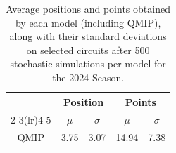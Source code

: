 \begin{table}[H]
\centering
\begin{tabular}{ccccc}
\toprule
\multicolumn{1}{l}{}               & \multicolumn{2}{c}{Position}   & \multicolumn{2}{c}{Points} \\ \cmidrule(lr){2-3}\cmidrule(lr){4-5}
\multicolumn{1}{c}{Model}          &    $\mu$ & $\sigma$ &   $\mu$  & $\sigma$ \\ \midrule
\multicolumn{1}{c}{QMIP          } &     3.75  &     3.07  &    14.94  &     7.38  \\
\bottomrule
\end{tabular}
\caption{Average positions and points obtained by each model (including QMIP), along with their standard deviations on selected circuits after 500 stochastic simulations per model for the 2024 Season.}
\label{tab:tab_qmip_vs_drl_stochastic_2024}
\end{table}